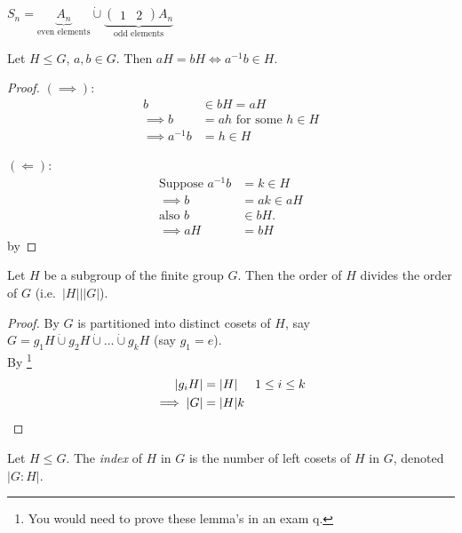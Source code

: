 \begin{example}
$S_n = \underbrace{A_n}_\text{even elements} \mathbin{\dot{\cup}} \underbrace{\begin{pmatrix}1 & 2\end{pmatrix} A_n}_\text{odd elements}$
\end{example}

\begin{lemma}
\protect\hypertarget{lem:eleven}{}\label{lem:eleven}
Let $H \leq G$, $a, b \in G$.
Then $aH = bH \iff a^{-1} b \in H$.
\end{lemma}

\begin{proof}
$(\implies)$:
\begin{align*}
    b &\in bH = aH \\
    \implies b &= ah \text{ for some } h \in H \\
    \implies a^{-1} b &= h \in H
\end{align*}

$(\Longleftarrow)$:
\begin{align*}
    \text{Suppose } a^{-1}b &= k \in H \\
    \implies b &= ak \in aH \\
    \text{also } b &\in bH. \\
    \implies aH &= bH
\end{align*} by 
\end{proof}

\begin{theorem}
\protect\hypertarget{thm:three}{}\label{thm:three}
Let $H$ be a subgroup of the finite group $G$.
Then the order of $H$ divides the order of $G$ (i.e.~$|H| \mathbin{\bigg|} |G|$).
\end{theorem}

\begin{proof}
By  $G$ is partitioned into distinct cosets of $H$, say $G = g_1 H \mathbin{\dot{\cup}} g_2 H \mathbin{\dot{\cup}} \dots \mathbin{\dot{\cup}} g_k H$ (say $g_1 = e$).\\
By \footnote{You would need to prove these lemma's in an exam q.}
\begin{align*}
    |g_i H| &= |H| \hspace{.5cm} 1 \leq i \leq k \\
    \implies |G| &= |H|k
\end{align*}
\end{proof}

\begin{definition}
\protect\hypertarget{def:fourteen}{}\label{def:fourteen}
Let $H \leq G$.
The \emph{index} of $H$ in $G$ is the number of left cosets of $H$ in $G$, denoted $|G : H|$.
\end{definition}

